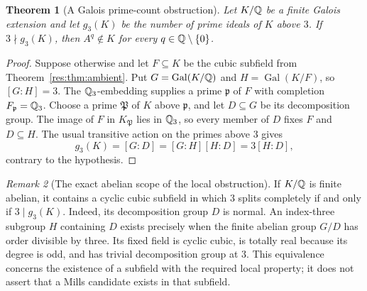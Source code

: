 \documentclass[11pt,a4paper]{article}
\newtheorem{theorem}{Theorem}[section]
\theoremstyle{remark}\newtheorem{remark}[theorem]{Remark}
\begin{document}
\begin{theorem}[A Galois prime-count obstruction]
\label{res:thm:galois}
Let $K/\mathbb Q$ be a finite Galois extension and let $g_3(K)$ be the
number of prime ideals of $K$ above $3$. If $3\nmid g_3(K)$, then
$A^q\notin K$ for every $q\in\mathbb Q\setminus\{0\}$.
\end{theorem}
\begin{proof}
Suppose otherwise and let $F\subseteq K$ be the cubic subfield from
Theorem~\ref{res:thm:ambient}. Put
$G=\operatorname{Gal}(K/\mathbb Q)$ and $H=\operatorname{Gal}(K/F)$, so
$[G:H]=3$. The $\mathbb Q_3$-embedding supplies a prime $\mathfrak p$ of
$F$ with completion $F_{\mathfrak p}=\mathbb Q_3$. Choose a prime
$\mathfrak P$ of $K$ above $\mathfrak p$, and let $D\subseteq G$ be
its decomposition group. The image of $F$ in $K_{\mathfrak P}$ lies
in $\mathbb Q_3$, so every member of $D$ fixes $F$ and $D\subseteq H$.
The usual transitive action on the primes above $3$ gives
\[
 g_3(K)=[G:D]=[G:H][H:D]=3[H:D],
\]
contrary to the hypothesis.
\end{proof}

\begin{remark}[The exact abelian scope of the local obstruction]
\label{res:rem:abelian}
If $K/\mathbb Q$ is finite abelian, it contains a cyclic cubic subfield in
which $3$ splits completely if and only if $3\mid g_3(K)$.
Indeed, its decomposition group $D$ is normal. An index-three
subgroup $H$ containing $D$ exists precisely when the finite abelian
group $G/D$ has order divisible by three. Its fixed field is cyclic
cubic, is totally real because its degree is odd, and has trivial
decomposition group at $3$. This equivalence concerns the existence
of a subfield with the required local property; it does not assert
that a Mills candidate exists in that subfield.
\end{remark}
\end{document}

